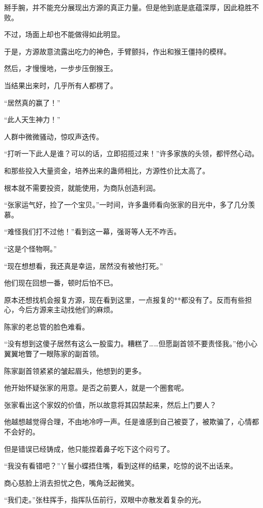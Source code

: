 \begin{this_body}
掰手腕，并不能充分展现出方源的真正力量。但是他到底是底蕴深厚，因此稳胜不败。

不过，场面上却也不能做得如此明显。

于是，方源故意流露出吃力的神色，手臂颤抖，作出和猴王僵持的模样。

然后，才慢慢地，一步步压倒猴王。

当结果出来时，几乎所有人都楞了。

“居然真的赢了！”

“此人天生神力！”

人群中微微骚动，惊叹声迭传。

“打听一下此人是谁？可以的话，立即招揽过来！”许多家族的头领，都怦然心动。

和那些投入大量资金，培养出来的蛊师相比，方源性价比太高了。

根本就不需要投资，就能使用，为商队创造利润。

“张家运气好，捡了一个宝贝。”一时间，许多蛊师看向张家的目光中，多了几分羡慕。

“难怪我们打不过他！”看到这一幕，强哥等人无不咋舌。

“这是个怪物啊。”

“现在想想看，我还真是幸运，居然没有被他打死。”

他们现在回想一番，顿时后怕不已。

原本还想找机会报复方源，现在看到这里，一点报复的**都没有了。反而有些担心，今后方源来主动找他们的麻烦。

陈家的老总管的脸色难看。

“没有想到这傻子居然有这么一股蛮力。糟糕了……但愿副首领不要责怪我。”他小心翼翼地瞥了一眼陈家的副首领。

陈家副首领紧紧的皱起眉头，他想到的更多。

他开始怀疑张家的用意。是否之前要人，就是一个圈套呢。

张家看出这个家奴的价值，所以故意将其囚禁起来，然后上门要人？

他越想越觉得合理，不由地冷哼一声。任是谁感到自己被耍了，被欺骗了，心情都不会好的。

但是错误已经铸成，他只能捏着鼻子吃下这个闷亏了。

“我没有看错吧？”丫鬟小蝶捂住嘴，看到这样的结果，吃惊的说不出话来。

商心慈脸上消去担忧之色，嘴角泛起微笑。

“我们走。”张柱挥手，指挥队伍前行，双眼中亦散发着复杂的光。


\end{this_body}
